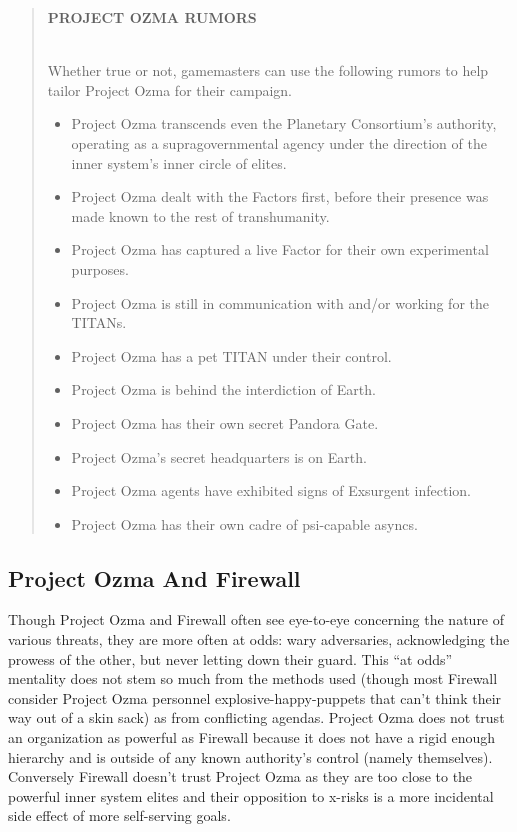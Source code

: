 \begin{quotation} \begin{large} \textbf{PROJECT OZMA RUMORS} \end{large} \\ Whether true or not, gamemasters can use the following rumors to help tailor Project Ozma for their campaign. \begin{itemize} \item Project Ozma transcends even the Planetary Consortium’s authority, operating as a supragovernmental agency under the direction of the inner system’s inner circle of elites. \item Project Ozma dealt with the Factors first, before their presence was made known to the rest of transhumanity. \item Project Ozma has captured a live Factor for their own experimental purposes. \item Project Ozma is still in communication with and/or working for the TITANs. \item Project Ozma has a pet TITAN under their control. \item Project Ozma is behind the interdiction of Earth. \item Project Ozma has their own secret Pandora Gate. \item Project Ozma’s secret headquarters is on Earth. \item Project Ozma agents have exhibited signs of Exsurgent infection. \item Project Ozma has their own cadre of psi-capable asyncs. \end{itemize} \end{quotation} 

\subsection{Project Ozma And Firewall } 

Though Project Ozma and Firewall often see eye-to-eye concerning the nature of various threats, they are more often at odds: wary adversaries, acknowledging the prowess of the other, but never letting down their guard. This ``at odds'' mentality does not stem so much from the methods used (though most Firewall consider Project Ozma personnel explosive-happy-puppets that can't think their way out of a skin sack) as from conflicting agendas. Project Ozma does not trust an organization as powerful as Firewall because it does not have a rigid enough hierarchy and is outside of any known authority's control (namely themselves). Conversely Firewall doesn't trust Project Ozma as they are too close to the powerful inner system elites and their opposition to x-risks is a more incidental side effect of more self-serving goals. 



